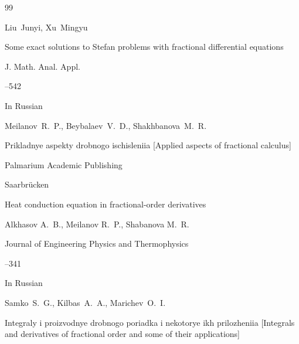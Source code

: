 \begin{thebibliography}{99}








\by Liu~Junyi, Xu~Mingyu

\paper Some exact solutions to Stefan problems with fractional differential equations

\jour J. Math. Anal. Appl.




--542





\lang In Russian

\by Meilanov~R.~P., Beybalaev~V.~D., Shakhbanova~M.~R.

\book Prikladnye aspekty drobnogo ischisleniia \rm [Applied aspects of fractional calculus]

\publ Palmarium Academic Publishing

\publaddr  Saarbrücken








\paper Heat conduction equation in fractional-order derivatives

\by Alkhasov A.~B., Meilanov R.~P., Shabanova M.~R.

\jour  Journal of Engineering Physics and Thermophysics




--341



 


\lang In Russian

\by Samko~S.~G., Kilbas~A.~A., Marichev~O.~I.

\book Integraly i proizvodnye drobnogo poriadka i nekotorye ikh prilozheniia \rm [Integrals and derivatives of fractional order and some of their applications] 


\end{thebibliography}
